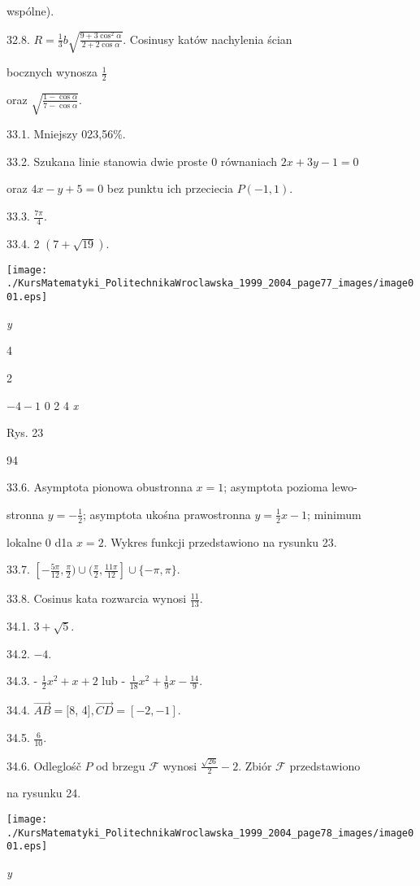 \documentclass[a4paper,12pt]{article}
\begin{document}
wspólne).

32.8. $R = \displaystyle \frac{1}{3}b \sqrt{\frac{9+3\cos^{2}\alpha}{2+2\cos\alpha}}$. Cosinusy katów nachylenia ścian

bocznych wynosza $\displaystyle \frac{1}{2}$

oraz $\sqrt{\frac{1-\cos\alpha}{7-\cos\alpha}}.$

33.1. Mniejszy 023,56\%.

33.2. Szukana linie stanowia dwie proste $0$ równaniach $2x+3y-1=0$

oraz $4x-y+5=0$ bez punktu ich przeciecia $P(-1,1).$

33.3. $\displaystyle \frac{7\pi}{4}.$

33.4. 2 $(7+\sqrt{19}).$
\begin{center}
\texttt{[image: ./KursMatematyki\_PolitechnikaWroclawska\_1999\_2004\_page77\_images/image001.eps]}
\end{center}
{\it y}

4

2

$-4  -1$  0 2  4  {\it x}

Rys. 23





94

33.6. Asymptota pionowa obustronna $x=1$; asymptota pozioma lewo-

stronna $y= -\displaystyle \frac{1}{2}$; asymptota ukośna prawostronna $y= \displaystyle \frac{1}{2}x-1$; minimum

lokalne 0 d1a $x=2$. Wykres funkcji przedstawiono na rysunku 23.

33.7. $[-\displaystyle \frac{5\pi}{12},\frac{\pi}{2})\cup(\frac{\pi}{2},\frac{11\pi}{12}]\cup\{-\pi,\pi\}.$

33.8. Cosinus kata rozwarcia wynosi $\displaystyle \frac{11}{13}.$

34.1. $3+\sqrt{5}.$

34.2. $-4.$

34.3. - $\displaystyle \frac{1}{2}x^{2}+x+2$ lub - $\displaystyle \frac{1}{18}x^{2}+\frac{1}{9}x-\frac{14}{9}.$

34.4. $\vec{AB}=[8$, 4$], \vec{CD}=[-2,-1].$

34.5. $\displaystyle \frac{6}{10}.$

34.6. Odleglośč $P$ od brzegu $\mathcal{F}$ wynosi $\displaystyle \frac{\sqrt{26}}{2}-2$. Zbiór $\mathcal{F}$ przedstawiono

na rysunku 24.
\begin{center}
\texttt{[image: ./KursMatematyki\_PolitechnikaWroclawska\_1999\_2004\_page78\_images/image001.eps]}
\end{center}
{\it y}
\end{document}
